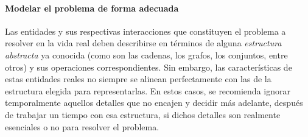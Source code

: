\paragraph*{Modelar el problema de forma adecuada}{
  Las entidades y sus respectivas interacciones que constituyen el problema a resolver en la vida real deben describirse en términos de alguna \emph{estructura abstracta} ya conocida (como son las cadenas, los grafos, los conjuntos, entre otros) y sus operaciones correspondientes.
  Sin embargo, las características de estas entidades reales no siempre se alinean perfectamente con las de la estructura elegida para representarlas.
  En estos casos, se recomienda ignorar temporalmente aquellos detalles que no encajen y decidir más adelante, después de trabajar un tiempo con esa estructura, si dichos detalles son realmente esenciales o no para resolver el problema.
}

